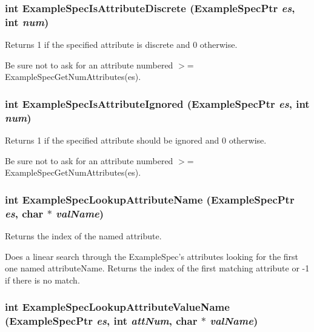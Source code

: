 \subsubsection{\setlength{\rightskip}{0pt plus 5cm}int Example\-Spec\-Is\-Attribute\-Discrete ({\bf Example\-Spec\-Ptr} {\em es}, int {\em num})}\label{ExampleSpec_8h_a34}


Returns 1 if the specified attribute is discrete and 0 otherwise. 

Be sure not to ask for an attribute numbered $>$= Example\-Spec\-Get\-Num\-Attributes(es). 
\subsubsection{\setlength{\rightskip}{0pt plus 5cm}int Example\-Spec\-Is\-Attribute\-Ignored ({\bf Example\-Spec\-Ptr} {\em es}, int {\em num})}\label{ExampleSpec_8h_a36}


Returns 1 if the specified attribute should be ignored and 0 otherwise. 

Be sure not to ask for an attribute numbered $>$= Example\-Spec\-Get\-Num\-Attributes(es). 
\subsubsection{\setlength{\rightskip}{0pt plus 5cm}int Example\-Spec\-Lookup\-Attribute\-Name ({\bf Example\-Spec\-Ptr} {\em es}, char $\ast$ {\em val\-Name})}\label{ExampleSpec_8h_a39}


Returns the index of the named attribute. 

Does a linear search through the Example\-Spec's attributes looking for the first one named attribute\-Name. Returns the index of the first matching attribute or -1 if there is no match. 
\subsubsection{\setlength{\rightskip}{0pt plus 5cm}int Example\-Spec\-Lookup\-Attribute\-Value\-Name ({\bf Example\-Spec\-Ptr} {\em es}, int {\em att\-Num}, char $\ast$ {\em val\-Name})}\label{ExampleSpec_8h_a40}


